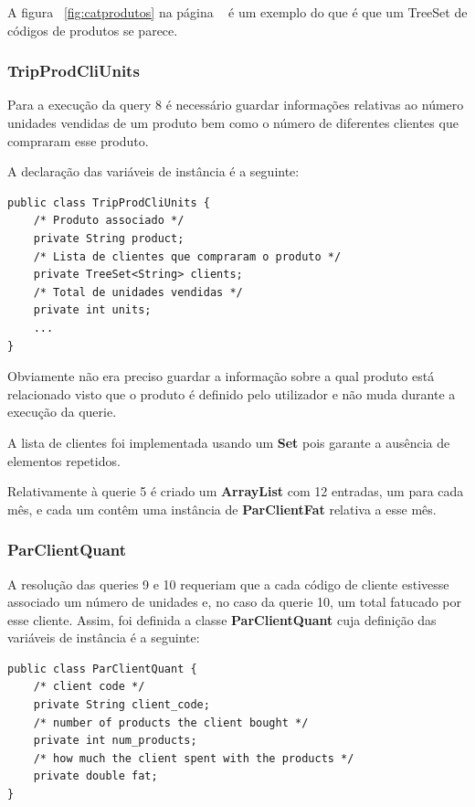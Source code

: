 \documentclass[10pt] {article}
\begin{document}
A figura ~\ref{fig:catprodutos} na página ~\pageref{fig:catprodutos} é um exemplo do que é que um TreeSet de
códigos de produtos se parece.

\subsubsection{TripProdCliUnits}

Para a execução da query 8 é necessário guardar informações relativas ao número unidades vendidas de um produto
bem como o número de diferentes clientes que compraram esse produto.

A declaração das variáveis de instância é a seguinte:

\begin{lstlisting}
public class TripProdCliUnits {
	/* Produto associado */
	private String product;
	/* Lista de clientes que compraram o produto */
	private TreeSet<String> clients;
	/* Total de unidades vendidas */
	private int units;
	...
}
\end{lstlisting}


Obviamente não era preciso guardar a informação sobre a qual produto está relacionado visto que o produto é definido
pelo utilizador e não muda durante a execução da querie.

A lista de clientes foi implementada usando um \textbf{Set} pois garante a ausência de elementos repetidos.

Relativamente à querie 5 é criado um \textbf{ArrayList} com 12 entradas, um para cada mês, e cada um contêm uma
instância de \textbf{ParClientFat} relativa a esse mês.

\subsubsection{ParClientQuant}

A resolução das queries 9 e 10 requeriam que a cada código de cliente estivesse associado um número de unidades e,
no caso da querie 10, um total fatucado por esse cliente. Assim, foi definida a classe \textbf{ParClientQuant} cuja
definição das variáveis de instância é a seguinte:

\begin{lstlisting}
public class ParClientQuant {
    /* client code */
	private String client_code;
	/* number of products the client bought */
    private int num_products;
    /* how much the client spent with the products */
    private double fat;
}
\end{lstlisting}
\end{document}
